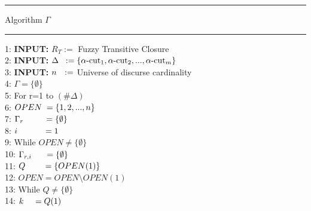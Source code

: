 \documentclass[11pt, oneside]{Thesis} %
\begin{document}
\newpage
\noindent\rule[0.1cm]{\linewidth}{0.3pt}
\begin{center}
  \vspace{-1cm}
  Algorithm $\Gamma$
  \vspace{-1cm}
\end{center}
\noindent\rule[0.1cm]{\linewidth}{0.3pt}
1:  \hspace{0.3cm}\textbf{INPUT:} $R_T :=$ Fuzzy Transitive Closure\\
2:  \hspace{0.3cm}\textbf{INPUT:} $\Delta \hspace{0.2cm} := \lbrace \alpha\text{-cut}_1, \alpha\text{-cut}_2, ..., \alpha\text{-cut}_m \rbrace$\\
3:  \hspace{0.3cm}\textbf{INPUT:} $n\hspace{0.24cm}:=$ Universe of discurse cardinality\\
4:  \hspace{0.5cm}$\Gamma = \lbrace \emptyset \rbrace$\\
5:  \hspace{0.5cm}For r=1 to $(\#\Delta)$\\
6:  \hspace{1cm}$OPEN \hspace{0.1cm} = \lbrace 1,2,...,n \rbrace$\\
7:  \hspace{1cm}$\Gamma_r \hspace{0.86cm} = \lbrace \emptyset \rbrace$\\
8:  \hspace{1cm}$i \hspace{1.1cm} = 1$\\
9:  \hspace{1cm}While $OPEN \neq \lbrace \emptyset \rbrace$\\
10: \hspace{1.4cm}$\Gamma_{r,i} \hspace{0.55cm} = \lbrace \emptyset \rbrace$\\
11: \hspace{1.4cm}$Q \hspace{0.75cm} = \lbrace OPEN(1) \rbrace$\\
12: \hspace{1.4cm}$OPEN = OPEN \setminus OPEN(1)$\\
13: \hspace{1.4cm}While $Q \neq \lbrace \emptyset \rbrace$\\
14: \hspace{1.9cm}$k \hspace{0.4cm} = Q(1)$\\
\end{document}
